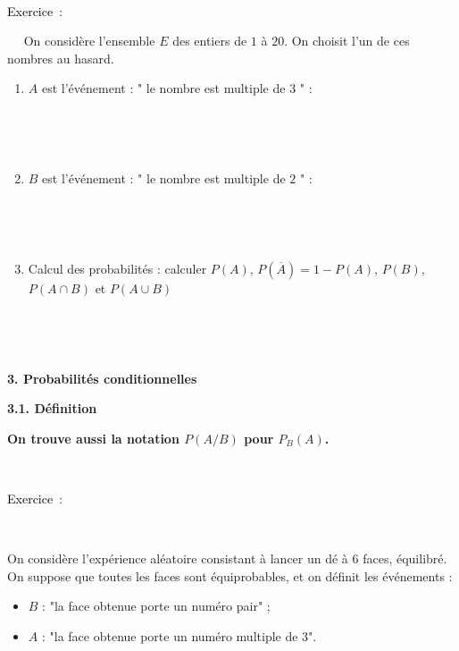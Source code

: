 \documentclass[11pt,a4paper]{article}
\newcounter{numexos}%
\newcommand{\exercice}[1]{%
\addtocounter{numexos}{1}%
\textcolor{black}{\normalsize Exercice\,\thenumexos\,}\,#1%
}
\newcommand{\bex}[2]
{\begin{bclogo}[couleur = white,logo= , barre=none,  arrondi = 0.1]
{~\exercice:~~{#1}}
~~
{#2}
~~
\end{bclogo}}
\newcommand{\cadre}[1]
{\begin{bclogo}[couleur = white,logo=,  arrondi = 0.1,barre=none]
~~
{%
\rule{0mm}{#1mm}}\par
\medskip
~~
\end{bclogo}}
\newcommand{\cadreblanc}[1]{%
\medskip\framebox[\linewidth][c]{%
\rule{0mm}{#1mm}}\par
\medskip}
\begin{document}
\vfill 

\bex{}{
   On considère l'ensemble $E$ des entiers de $1$ à $20$. On choisit l'un de ces nombres au hasard. 
   }
   \vspace{8mm}
   \begin{enumerate}


       
  \item $A$ est l'événement : " le nombre est multiple de $3$ " :\\[2 pt]
  \cadre{1} 
  
   \item $B$ est l'événement : " le nombre est multiple de $2$ " :\\[2 pt]
  \cadre{1}
   
   \item Calcul des probabilités : calculer $P(A)$, $P(\overline{A})=1-P(A)$, $P(B)$, $P(A \cap B)$ et $P(A \cup B)$\\[2pt]
\cadre {35}

   \end{enumerate}


\vfill 
\newpage


\begin{mybox}
\begin{center}    
\textbf{3. Probabilités conditionnelles}

\end{center}
\end{mybox}

\vspace{5mm}

\begin{mybox}
\begin{center}    
\textbf{3.1. Définition}
\end{center}
\end{mybox}



\cadreblanc{45}




   \begin{center}
       
  \textbf{On trouve aussi la notation $P(A/B)$ pour $P_B(A)$.}
 \end{center}



\bex{}{
   On considère l'expérience aléatoire consistant à lancer un dé à $6$ faces, équilibré. On suppose que toutes les faces sont équiprobables, et on définit les événements :
   \begin{itemize}
      \item $B$ : "la face obtenue porte un numéro pair" ;
      \item $A$ : "la face obtenue porte un numéro multiple de $3$".
   \end{itemize}
   }
\end{document}
